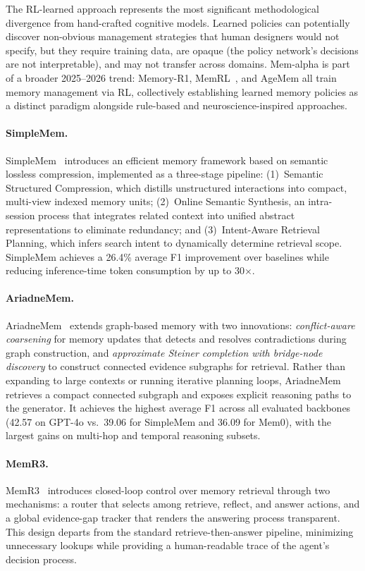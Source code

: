 The RL-learned approach represents the most significant methodological
divergence from hand-crafted cognitive models. Learned policies can
potentially discover non-obvious management strategies that human
designers would not specify, but they require training data, are
opaque (the policy network's decisions are not interpretable), and may
not transfer across domains. Mem-alpha is part of a broader 2025--2026
trend: Memory-R1, MemRL~\cite{zhang2026memrl}, and AgeMem all train
memory management via RL, collectively establishing learned memory
policies as a distinct paradigm alongside rule-based and
neuroscience-inspired approaches.

\paragraph{SimpleMem.}
SimpleMem~\cite{simplemem2026} introduces an efficient memory framework
based on semantic lossless compression, implemented as a three-stage
pipeline: (1)~Semantic Structured Compression, which distills
unstructured interactions into compact, multi-view indexed memory units;
(2)~Online Semantic Synthesis, an intra-session process that integrates
related context into unified abstract representations to eliminate
redundancy; and (3)~Intent-Aware Retrieval Planning, which infers search
intent to dynamically determine retrieval scope.  SimpleMem achieves a
26.4\% average F1 improvement over baselines while reducing
inference-time token consumption by up to 30$\times$.

\paragraph{AriadneMem.}
AriadneMem~\cite{ariadnemem2026} extends graph-based memory with two
innovations: \emph{conflict-aware coarsening} for memory updates that
detects and resolves contradictions during graph construction, and
\emph{approximate Steiner completion with bridge-node discovery} to
construct connected evidence subgraphs for retrieval.  Rather than
expanding to large contexts or running iterative planning loops,
AriadneMem retrieves a compact connected subgraph and exposes explicit
reasoning paths to the generator.  It achieves the highest average F1
across all evaluated backbones (42.57 on GPT-4o vs.\ 39.06 for SimpleMem
and 36.09 for Mem0), with the largest gains on multi-hop and temporal
reasoning subsets.

\paragraph{MemR3.}
MemR3~\cite{memr3_2025} introduces closed-loop control over memory
retrieval through two mechanisms: a router that selects among retrieve,
reflect, and answer actions, and a global evidence-gap tracker that
renders the answering process transparent.  This design departs from the
standard retrieve-then-answer pipeline, minimizing unnecessary lookups
while providing a human-readable trace of the agent's decision process.

